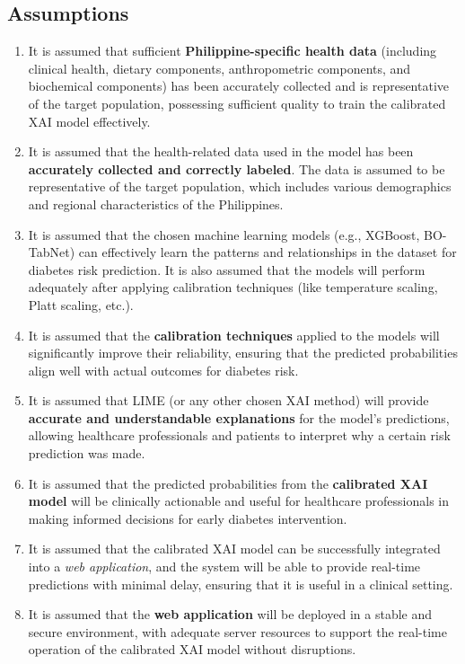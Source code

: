 \documentclass[11pt,a4paper,titlepage]{article}
\begin{document}
\subsection{Assumptions}
\begin{enumerate}
    \item It is assumed that sufficient \textbf{Philippine-specific health data} (including clinical health, dietary components, anthropometric components, and biochemical components) has been accurately collected and is representative of the target population, possessing sufficient quality to train the calibrated XAI model effectively.
    
    \item It is assumed that the health-related data used in the model has been \textbf{accurately collected and correctly labeled}. The data is assumed to be representative of the target population, which includes various demographics and regional characteristics of the Philippines.

    \item It is assumed that the chosen machine learning models (e.g., XGBoost, BO-TabNet) can effectively learn the patterns and relationships in the dataset for diabetes risk prediction. It is also assumed that the models will perform adequately after applying calibration techniques (like temperature scaling, Platt scaling, etc.).

    \item It is assumed that the \textbf{calibration techniques} applied to the models will significantly improve their reliability, ensuring that the predicted probabilities align well with actual outcomes for diabetes risk.

    \item It is assumed that LIME (or any other chosen XAI method) will provide \textbf{accurate and understandable explanations} for the model’s predictions, allowing healthcare professionals and patients to interpret why a certain risk prediction was made.

    \item It is assumed that the predicted probabilities from the \textbf{calibrated XAI model} will be clinically actionable and useful for healthcare professionals in making informed decisions for early diabetes intervention.

    \item It is assumed that the calibrated XAI model can be successfully integrated into a \textit{web application}, and the system will be able to provide real-time predictions with minimal delay, ensuring that it is useful in a clinical setting.

    \item It is assumed that the \textbf{web application} will be deployed in a stable and secure environment, with adequate server resources to support the real-time operation of the calibrated XAI model without disruptions.

\end{enumerate}
\end{document}
